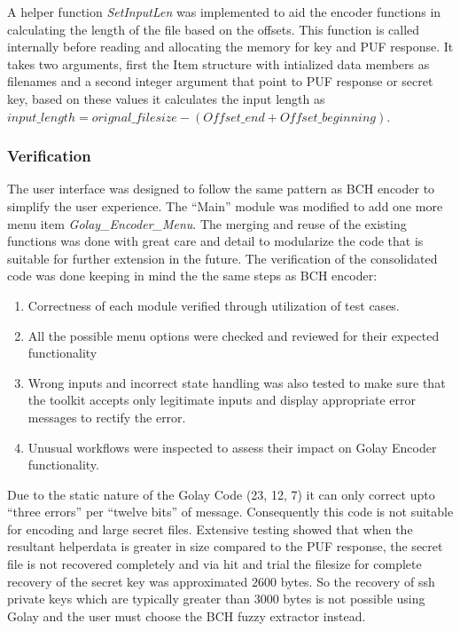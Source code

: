 A helper function \emph{SetInputLen} was implemented to aid the encoder functions in calculating the length of the file based on the offsets. This function is called internally before reading and allocating the memory for key and PUF response. It takes two arguments, first the Item structure with intialized data members as filenames and a second integer argument that point to PUF response or secret key, based on these values it calculates the input length as $input\_length =
orignal\_filesize - (Offset\_end + Offset\_beginning)$. \\

\subsubsection{Verification}
The user interface was designed to follow the same pattern as BCH encoder to simplify the user experience. The ``Main'' module was modified to add one more menu item \emph{Golay\_Encoder\_Menu}. The merging and reuse of the existing functions was done with great care and detail to modularize the code that is suitable for further extension in the future. The verification of the consolidated code was done keeping in mind the the same steps as BCH encoder:
\begin{enumerate}
	\item Correctness of each module verified through utilization of test cases.
	\item All the possible menu options were checked and reviewed for their expected functionality
	\item Wrong inputs and incorrect state handling was also tested to make sure that the toolkit accepts only legitimate inputs and display appropriate error messages to rectify the error.
	\item Unusual workflows were inspected to assess their impact on Golay Encoder functionality.
\end{enumerate}

Due to the static nature of the Golay Code (23, 12, 7) it can only correct upto ``three errors'' per ``twelve bits'' of message. Consequently this code is not suitable for encoding and large secret files. Extensive testing showed that when the resultant helperdata is greater in size compared to the PUF response, the secret file is not recovered completely and via hit and trial the filesize for complete recovery of the secret key was approximated $2600$ bytes. So the recovery of ssh private keys which are
typically greater than 3000 bytes is not possible using Golay and the user must choose the BCH fuzzy extractor instead.

